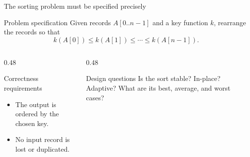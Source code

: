 \documentclass[aspectratio=169]{beamer}
\begin{document}
\begin{frame}{The sorting problem must be specified precisely}
  \small
  \begin{block}{Problem specification}
    Given records $A[0..n-1]$ and a key function $k$, rearrange the records so
    that
    \[
      k(A[0])\le k(A[1])\le\cdots\le k(A[n-1]).
    \]
  \end{block}
  \begin{columns}[T]
    \begin{column}{0.48\textwidth}
      \begin{exampleblock}{Correctness requirements}
        \begin{itemize}
          \item The output is ordered by the chosen key.
          \item No input record is lost or duplicated.
        \end{itemize}
      \end{exampleblock}
    \end{column}
    \begin{column}{0.48\textwidth}
      \begin{alertblock}{Design questions}
        Is the sort stable? In-place? Adaptive? What are its best, average,
        and worst cases?
      \end{alertblock}
    \end{column}
  \end{columns}
\end{frame}
\end{document}
